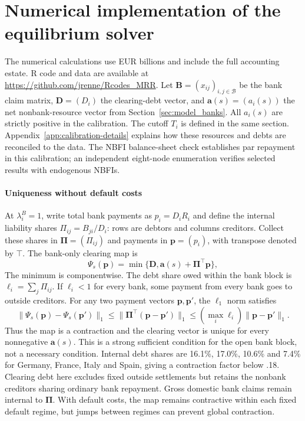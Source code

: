 \section{Numerical implementation of the equilibrium solver}\label{app:solver_details}

The numerical calculations use EUR billions and include the full accounting estate. R code and data are available at \url{https://github.com/jrenne/Rcodes_MRR}. Let $\mathbf{B}=(x_{ij})_{i,j\in\mathcal B}$ be the bank claim matrix, $\mathbf{D}=(D_i)$ the clearing-debt vector, and $\mathbf{a}(s)=(a_i(s))$ the net nonbank-resource vector from Section~\ref{sec:model_banks}. All $a_i(s)$ are strictly positive in the calibration. The cutoff $T_i$ is defined in the same section. Appendix~\ref{app:calibration-details} explains how these resources and debts are reconciled to the data. The NBFI balance-sheet check establishes par repayment in this calibration; an independent eight-node enumeration verifies selected results with endogenous NBFIs.

\paragraph{Uniqueness without default costs}
At $\lambda_i^B=1$, write total bank payments as $p_i=D_iR_i$ and define the internal liability shares $\Pi_{ij}=B_{ji}/D_i$: rows are debtors and columns creditors. Collect these shares in $\boldsymbol{\Pi}=(\Pi_{ij})$ and payments in $\mathbf{p}=(p_i)$, with transpose denoted by $\top$. The bank-only clearing map is
\[
 \Psi_s(\mathbf{p})=\min\{\mathbf{D},\mathbf{a}(s)+\boldsymbol{\Pi}^\top \mathbf{p}\},
\]
The minimum is componentwise. The debt share owed within the bank block is $\ell_i=\sum_j\Pi_{ij}$. If $\ell_i<1$ for every bank, some payment from every bank goes to outside creditors. For any two payment vectors $\mathbf{p},\mathbf{p}'$, the $\ell_1$ norm satisfies
\[
 \|\Psi_s(\mathbf{p})-\Psi_s(\mathbf{p}')\|_1
 \leq\|\boldsymbol{\Pi}^\top(\mathbf{p}-\mathbf{p}')\|_1
 \leq\left(\max_i\ell_i\right)\|\mathbf{p}-\mathbf{p}'\|_1.
\]
Thus the map is a contraction and the clearing vector is unique for every nonnegative $\mathbf{a}(s)$. This is a strong sufficient condition for the open bank block, not a necessary condition. Internal debt shares are 16.1\%, 17.0\%, 10.6\% and 7.4\% for Germany, France, Italy and Spain, giving a contraction factor below .18. Clearing debt here excludes fixed outside settlements but retains the nonbank creditors sharing ordinary bank repayment. Gross domestic bank claims remain internal to $\boldsymbol{\Pi}$. With default costs, the map remains contractive within each fixed default regime, but jumps between regimes can prevent global contraction.

